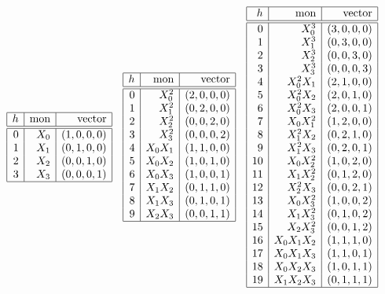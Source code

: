 \begin{table}
$$
\begin{array}{|r|r|r|}
\hline
h &  \mbox{mon} & \mbox{vector} \\
\hline
\hline
0 & X_0 & ( 1, 0, 0, 0 )\\
1 & X_1 & ( 0, 1, 0, 0 )\\
2 & X_2 & ( 0, 0, 1, 0 )\\
3 & X_3 & ( 0, 0, 0, 1 )\\
\hline
\end{array}
\quad
\begin{array}{|r|r|r|}
\hline
h &  \mbox{mon} & \mbox{vector} \\
\hline
\hline
0 & X_0^2 & ( 2, 0, 0, 0 )\\
1 & X_1^2 & ( 0, 2, 0, 0 )\\
2 & X_2^2 & ( 0, 0, 2, 0 )\\
3 & X_3^2 & ( 0, 0, 0, 2 )\\
4 & X_0X_1 & ( 1, 1, 0, 0 )\\
5 & X_0X_2 & ( 1, 0, 1, 0 )\\
6 & X_0X_3 & ( 1, 0, 0, 1 )\\
7 & X_1X_2 & ( 0, 1, 1, 0 )\\
8 & X_1X_3 & ( 0, 1, 0, 1 )\\
9 & X_2X_3 & ( 0, 0, 1, 1 )\\
\hline
\end{array}
\quad
\begin{array}{|r|r|r|}
\hline
h &  \mbox{mon} & \mbox{vector} \\
\hline
\hline
0 & X_0^3 & ( 3, 0, 0, 0 )\\
1 & X_1^3 & ( 0, 3, 0, 0 )\\
2 & X_2^3 & ( 0, 0, 3, 0 )\\
3 & X_3^3 & ( 0, 0, 0, 3 )\\
4 & X_0^2X_1 & ( 2, 1, 0, 0 )\\
5 & X_0^2X_2 & ( 2, 0, 1, 0 )\\
6 & X_0^2X_3 & ( 2, 0, 0, 1 )\\
7 & X_0X_1^2 & ( 1, 2, 0, 0 )\\
8 & X_1^2X_2 & ( 0, 2, 1, 0 )\\
9 & X_1^2X_3 & ( 0, 2, 0, 1 )\\
10 & X_0X_2^2 & ( 1, 0, 2, 0 )\\
11 & X_1X_2^2 & ( 0, 1, 2, 0 )\\
12 & X_2^2X_3 & ( 0, 0, 2, 1 )\\
13 & X_0X_3^2 & ( 1, 0, 0, 2 )\\
14 & X_1X_3^2 & ( 0, 1, 0, 2 )\\
15 & X_2X_3^2 & ( 0, 0, 1, 2 )\\
16 & X_0X_1X_2 & ( 1, 1, 1, 0 )\\
17 & X_0X_1X_3 & ( 1, 1, 0, 1 )\\
18 & X_0X_2X_3 & ( 1, 0, 1, 1 )\\
19 & X_1X_2X_3 & ( 0, 1, 1, 1 )\\
\hline
\end{array}
$$
\caption{\label{tab:PG3monomials}The partition ordering 
of monomials of degree $1$, $2$ and $3$ in $\PG(3,q)$}
\end{table}
